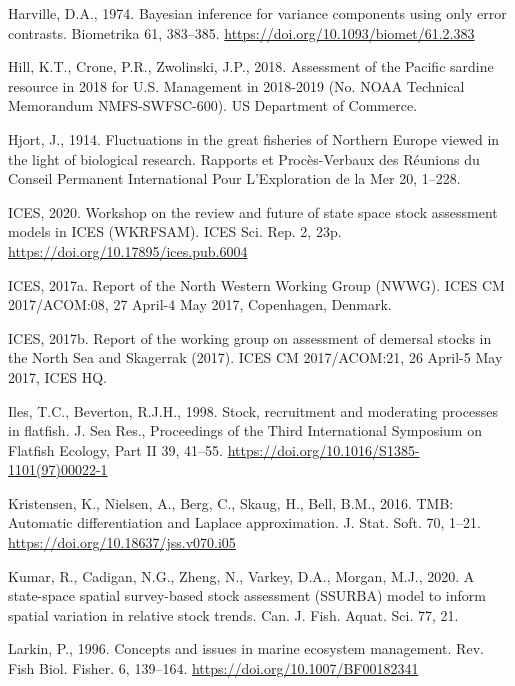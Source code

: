 \documentclass[]{article}
\begin{document}
\leavevmode\hypertarget{ref-harville1974Bayesian}{}%
Harville, D.A., 1974. Bayesian inference for variance components using
only error contrasts. Biometrika 61, 383--385.
\url{https://doi.org/10.1093/biomet/61.2.383}

\leavevmode\hypertarget{ref-hill2018Assessment}{}%
Hill, K.T., Crone, P.R., Zwolinski, J.P., 2018. Assessment of the
Pacific sardine resource in 2018 for U.S. Management in 2018-2019 (No.
NOAA Technical Memorandum NMFS-SWFSC-600). US Department of Commerce.

\leavevmode\hypertarget{ref-hjort1914Fluctuations}{}%
Hjort, J., 1914. Fluctuations in the great fisheries of Northern Europe
viewed in the light of biological research. Rapports et Procès-Verbaux
des Réunions du Conseil Permanent International Pour L'Exploration de la
Mer 20, 1--228.

\leavevmode\hypertarget{ref-ices2020Workshop}{}%
ICES, 2020. Workshop on the review and future of state space stock
assessment models in ICES (WKRFSAM). ICES Sci. Rep. 2, 23p.
\url{https://doi.org/10.17895/ices.pub.6004}

\leavevmode\hypertarget{ref-ices2017Reporta}{}%
ICES, 2017a. Report of the North Western Working Group (NWWG). ICES CM
2017/ACOM:08, 27 April-4 May 2017, Copenhagen, Denmark.

\leavevmode\hypertarget{ref-ices2017Report}{}%
ICES, 2017b. Report of the working group on assessment of demersal
stocks in the North Sea and Skagerrak (2017). ICES CM 2017/ACOM:21, 26
April-5 May 2017, ICES HQ.

\leavevmode\hypertarget{ref-iles1998Stock}{}%
Iles, T.C., Beverton, R.J.H., 1998. Stock, recruitment and moderating
processes in flatfish. J. Sea Res., Proceedings of the Third
International Symposium on Flatfish Ecology, Part II 39, 41--55.
\url{https://doi.org/10.1016/S1385-1101(97)00022-1}

\leavevmode\hypertarget{ref-kristensen2016TMB}{}%
Kristensen, K., Nielsen, A., Berg, C., Skaug, H., Bell, B.M., 2016. TMB:
Automatic differentiation and Laplace approximation. J. Stat. Soft. 70,
1--21. \url{https://doi.org/10.18637/jss.v070.i05}

\leavevmode\hypertarget{ref-kumar2020Statespace}{}%
Kumar, R., Cadigan, N.G., Zheng, N., Varkey, D.A., Morgan, M.J., 2020. A
state-space spatial survey-based stock assessment (SSURBA) model to
inform spatial variation in relative stock trends. Can. J. Fish. Aquat.
Sci. 77, 21.

\leavevmode\hypertarget{ref-larkin1996Concepts}{}%
Larkin, P., 1996. Concepts and issues in marine ecosystem management.
Rev. Fish Biol. Fisher. 6, 139--164.
\url{https://doi.org/10.1007/BF00182341}
\end{document}
